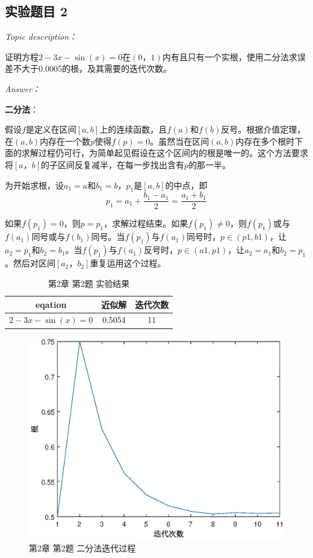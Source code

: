 \documentclass[12pt]{ctexart}
\begin{document}
	\subsection{实验题目 2}
	\textit{Topic description：}
	
	证明方程$2-3x-\sin(x)=0$在$(0，1)$内有且只有一个实根，使用二分法求误差不大于$0.0005$的根，及其需要的迭代次数。
	
	\textit{Answer：}
	
	\textbf{二分法}：
	
	假设$f$是定义在区间$[a,b]$上的连续函数，且$f(a)$和$f(b)$反号。根据介值定理，在$(a,b)$内存在一个数$p$使得$f(p)=0$。虽然当在区间$(a,b)$内存在多个根时下面的求解过程仍可行，为简单起见假设在这个区间内的根是唯一的。这个方法要求将$[a，b]$的子区间反复减半，在每一步找出含有$p$的那一半。
	
	为开始求根，设$a_1=a$和$b_1=b$，$p_1$是$[a,b]$的中点，即
	\begin{equation*}
	p_1=a_1+\frac{b_1-a_1}{2}=\frac{a_1+b_1}{2}
	\end{equation*}
	
	如果$f(p_1)=0$，则$p=p_1$，求解过程结束。如果$f(p_1)\neq0$，则$f(p_1)$或与$f(a_1)$同号或与$f(b_1)$同号。当$f(p_1)$与$f(a_1)$同号时，$p\in(p1,b1)$，让$a_2=p_1$和$b_2=b_1$。当$f(p_1)$与$f(a_1)$反号时，$p\in(a1,p1)$，让$a_2=a_1$和$b_2=p_1$。然后对区间$[a_2，b_2]$重复运用这个过程。
	
	\begin{table}[htbp]
		\centering
		\caption{第2章 第2题 实验结果}
		\begin{tabular}
			{c|c|c}
			\hline
			eqation&近似解&迭代次数 \\
			\hline
			$2-3x-\sin(x)=0$&0.5054&11 \\
			\hline
		\end{tabular}
	\end{table}
	
	\begin{figure}[htbp]
		\centering
		\includegraphics[scale=0.8]{e2_2.eps}
		\caption{第2章 第2题 二分法迭代过程}
	\end{figure}
	
\end{document}
